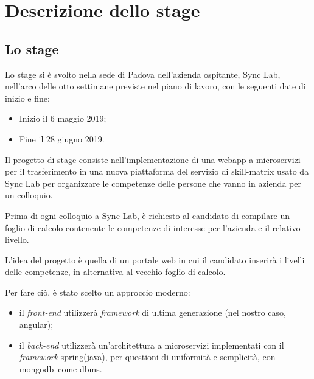 
\chapter{Descrizione dello stage}\label{cap:descrizione-stage}



\section{Lo stage}

Lo stage si è svolto nella sede di Padova dell'azienda ospitante, Sync Lab, nell'arco delle otto settimane previste nel piano di lavoro, con le seguenti date di inizio e fine:
\begin{itemize}
	\item Inizio il 6 maggio 2019;
	\item Fine il 28 giugno 2019.
\end{itemize}
Il progetto di stage consiste nell'implementazione di una \gls{webapp} a microservizi per il trasferimento in una nuova piattaforma del servizio di \gls{skill-matrix} usato da Sync Lab per organizzare le competenze delle persone che vanno in azienda per un colloquio.

Prima di ogni colloquio a Sync Lab, è richiesto al candidato di compilare un foglio di calcolo contenente le competenze di interesse
per l'azienda e il relativo livello.

L'idea del progetto è quella di un portale web in cui il candidato inserirà i livelli delle competenze, in alternativa al vecchio foglio di calcolo.

Per fare ciò, è stato scelto un approccio moderno: 
\begin{itemize}
	\item il \textit{front-end} utilizzerà \textit{framework} di ultima generazione (nel nostro caso, \gls{angular}\gloss);
	\item il \textit{back-end} utilizzerà un'architettura a microservizi implementati con il \textit{framework} \gls{spring}\gloss (\gls{java}\gloss), per questioni di uniformità e semplicità, con \gls{mongodb}\gloss\ come \gls{dbms}\gloss.
\end{itemize}

